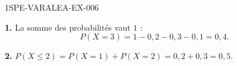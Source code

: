 \begin{corrige}{1SPE-VARALEA-EX-006}

\textbf{1.} La somme des probabilités vaut $1$ :
\[P(X=3) = 1 - 0{,}2 - 0{,}3 - 0{,}1 = 0{,}4.\]

\medskip
\textbf{2.} $P(X \leq 2) = P(X=1)+P(X=2) = 0{,}2+0{,}3 = 0{,}5$.

\end{corrige}
